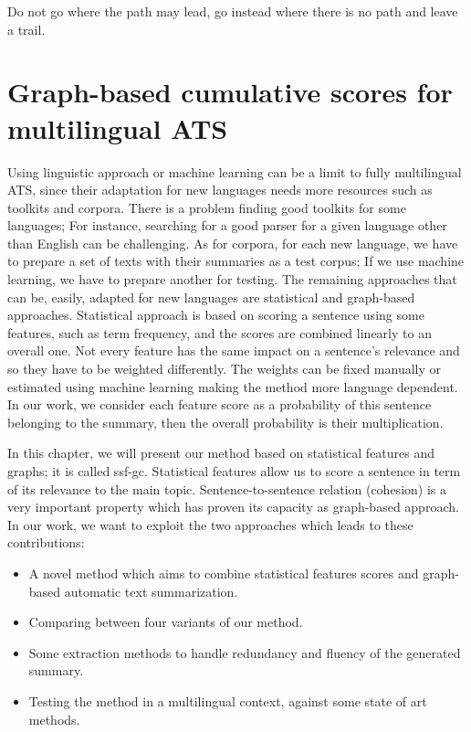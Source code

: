 \begin{savequote}[75mm] 
Do not go where the path may lead, go instead where there is no path and leave a trail.
\end{savequote}

\chapter{Graph-based cumulative scores for multilingual ATS}
\label{chap:gc}

Using linguistic approach or machine learning can be a limit to fully multilingual ATS, since their adaptation for new languages needs more resources such as toolkits and corpora.
There is a problem finding good toolkits for some languages; For instance, searching for a good parser for a given language other than English can be challenging.
As for corpora, for each new language, we have to prepare a set of texts with their summaries as a test corpus; If we use machine learning, we have to prepare another for testing.
The remaining approaches that can be, easily, adapted for new languages are statistical and graph-based approaches. 
Statistical approach is based on scoring a sentence using some features, such as term frequency, and the scores are combined linearly to an overall one. 
Not every feature has the same impact on a sentence's relevance and so they have to be weighted differently. 
The weights can be fixed manually or estimated using machine learning making the method more language dependent. 
In our work, we consider each feature score as a probability of this sentence belonging to the summary, then the overall probability is their multiplication. 

In this chapter, we will present our method based on statistical features and graphs; it is called \acf{ssf-gc}.
Statistical features allow us to score a sentence in term of its relevance to the main topic. 
Sentence-to-sentence relation (cohesion) is a very important property which has proven its capacity as graph-based approach. 
In our work, we want to exploit the two approaches which leads to these contributions: 
\begin{itemize}
	\item A novel method which aims to combine statistical features scores and graph-based automatic text summarization.
	\item Comparing between four variants of our method.
	\item Some extraction methods to handle redundancy and fluency of the generated summary.
	\item Testing the method in a multilingual context, against some state of art methods.
\end{itemize}

